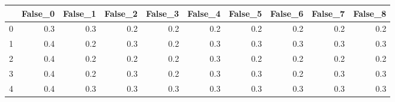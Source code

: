 \begin{tabular}{lrrrrrrrrr}
\toprule
{} &  False\_0 &  False\_1 &  False\_2 &  False\_3 &  False\_4 &  False\_5 &  False\_6 &  False\_7 &  False\_8 \\ \hline
\midrule
0 &      0.3 &      0.3 &      0.2 &      0.2 &      0.2 &      0.2 &      0.2 &      0.2 &      0.2 \\ \hline
1 &      0.4 &      0.2 &      0.3 &      0.2 &      0.3 &      0.3 &      0.3 &      0.3 &      0.3 \\ \hline
2 &      0.4 &      0.2 &      0.2 &      0.2 &      0.3 &      0.2 &      0.2 &      0.2 &      0.2 \\ \hline
3 &      0.4 &      0.2 &      0.3 &      0.2 &      0.3 &      0.3 &      0.2 &      0.3 &      0.3 \\ \hline
4 &      0.4 &      0.3 &      0.3 &      0.3 &      0.3 &      0.3 &      0.3 &      0.3 &      0.3 \\ \hline
\bottomrule
\end{tabular}
